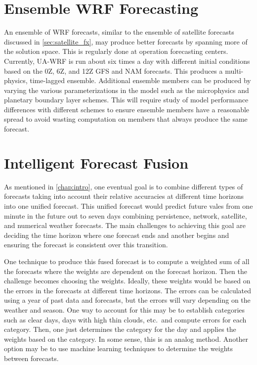 \section{Ensemble WRF Forecasting}

An ensemble of WRF forecasts, similar to the ensemble of satellite
forecasts discussed in \cref{sec:satellite_fx}, may produce better
forecasts by spanning more of the solution space.
This is regularly done at operation forecasting centers.
Currently, UA-WRF is run about six times a day with different initial
conditions based on the 0Z, 6Z, and 12Z GFS and NAM forecasts.
This produces a multi-physics, time-lagged ensemble.
Additional ensemble members can be produced by varying the various
parameterizations in the model such as the microphysics and planetary
boundary layer schemes.
This will require study of model performance differences with
different schemes to ensure ensemble members have a reasonable spread
to avoid wasting computation on members that always produce the same
forecast.

\section{Intelligent Forecast Fusion}

As mentioned in \cref{chap:intro}, one eventual goal is to combine
different types of forecasts taking into account their relative
accuracies at different time horizons into one unified forecast.
This unified forecast would predict future vales from one minute in
the future out to seven days combining persistence, network,
satellite, and numerical weather forecasts.
The main challenges to achieving this goal are deciding the time
horizon where one forecast ends and another begins and ensuring the
forecast is consistent over this transition.

One technique to produce this fused forecast is to compute a weighted sum
of all the forecasts where the weights are dependent on the forecast
horizon.
Then the challenge becomes choosing the weights.
Ideally, these weights would be based on the errors in the forecasts
at different time horizons.
The errors can be calculated using a year of past data and forecasts,
but the errors will vary depending on the weather and season.
One way to account for this may be to establish categories such as
clear days, days with high thin clouds, etc.\ and compute errors for
each category.
Then, one just determines the category for the day and applies the
weights based on the category.
In some sense, this is an analog method.
Another option may be to use machine learning techniques to determine
the weights between forecasts.


